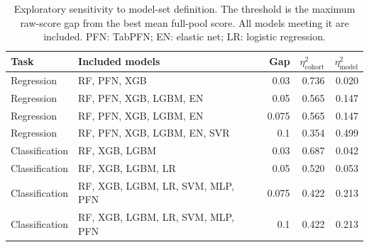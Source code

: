 \begin{table}[!t]
\caption{Exploratory sensitivity to model-set definition. The threshold is the maximum raw-score gap from the best mean full-pool score. All models meeting it are included. PFN: TabPFN; EN: elastic net; LR: logistic regression.}
\label{tab:model-sensitivity}
\centering\footnotesize
\begin{tabular}{llrrr}
\toprule
\textbf{Task} & \textbf{Included models} & \textbf{Gap} & $\eta^2_{\mathrm{cohort}}$ & $\eta^2_{\mathrm{model}}$ \\
\midrule
Regression & RF, PFN, XGB & 0.03 & 0.736 & 0.020 \\
Regression & RF, PFN, XGB, LGBM, EN & 0.05 & 0.565 & 0.147 \\
Regression & RF, PFN, XGB, LGBM, EN & 0.075 & 0.565 & 0.147 \\
Regression & RF, PFN, XGB, LGBM, EN, SVR & 0.1 & 0.354 & 0.499 \\
Classification & RF, XGB, LGBM & 0.03 & 0.687 & 0.042 \\
Classification & RF, XGB, LGBM, LR & 0.05 & 0.520 & 0.053 \\
Classification & RF, XGB, LGBM, LR, SVM, MLP, PFN & 0.075 & 0.422 & 0.213 \\
Classification & RF, XGB, LGBM, LR, SVM, MLP, PFN & 0.1 & 0.422 & 0.213 \\
\bottomrule
\end{tabular}
\end{table}
